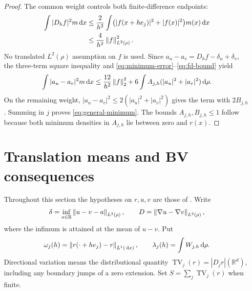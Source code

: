 \documentclass[11pt]{article}
\numberwithin{equation}{section}
\theoremstyle{remark}\newtheorem{remark}[theorem]{Remark}
\newcommand{\R}{\mathbb R}\newcommand{\E}{\mathbb E}
\begin{document}
\begin{proof}
The common weight controls both finite-difference endpoints:
\begin{align}
 \int|D_hf|^2m\,\mathrm d x
 &\le\frac2{h^2}\int\bigl(|f(x+he_j)|^2+|f(x)|^2\bigr)m(x)\,\mathrm d x\notag\\
 &\le\frac4{h^2}\left\lVert f\right\rVert_{L^2(\rho)}^2.\label{eq:fd-bound}
\end{align}
No translated $L^2(\rho)$ assumption on $f$ is used. Since
$a_u-a_v=D_hf-\delta_u+\delta_v$, the three-term square inequality and \eqref{eq:minimum-error}--\eqref{eq:fd-bound} yield
\[
 \int|a_u-a_v|^2m\,\mathrm d x
 \le\frac{12}{h^2}\left\lVert f\right\rVert_2^2
          +6\int A_{j,h}(|a_u|^2+|a_v|^2)\,\mathrm d\rho.
\]
On the remaining weight, $|a_u-a_v|^2\le2(|a_u|^2+|a_v|^2)$ gives the term with $2B_{j,h}$. Summing in $j$ proves \eqref{eq:general-minimum}. The bounds $A_{j,h},B_{j,h}\le1$ follow because both minimum densities in $A_{j,h}$ lie between zero and $r(x)$.
\end{proof}

\section{Translation means and BV consequences}\label{sec:bv}
Throughout this section the hypotheses on $r,u,v$ are those of . Write
\[
 \delta=\inf_{a\in\R}\norm{u-v-a}_{L^2(\rho)},\qquad
 D=\norm{\nabla u-\nabla v}_{L^2(\rho)},
\]
where the infimum is attained at the mean of $u-v$. Put
\[
 \omega_j(h)=\left\lVert r(\cdot+he_j)-r\right\rVert_{L^1(\,\mathrm d x)},\qquad
 \lambda_j(h)=\int W_{j,h}\,\mathrm d\rho.
\]
Directional variation means the distributional quantity
$\operatorname{TV}_j(r)=|D_jr|(\R^d)$, including any boundary jumps of a zero extension. Set $S=\sum_j\operatorname{TV}_j(r)$ when finite.
\end{document}
